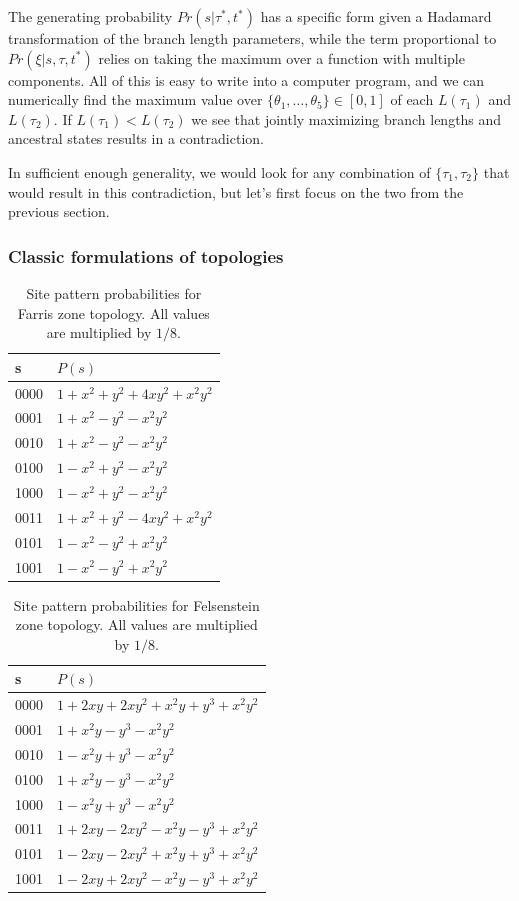 \documentclass[a4paper]{article}
\begin{document}
The generating probability $Pr(s | \tau^*, t^*)$ has a specific form given a Hadamard transformation of the branch length parameters, while the term proportional to $Pr(\xi | s, \tau, t^*)$ relies on taking the maximum over a function with multiple components.
All of this is easy to write into a computer program, and we can numerically find the maximum value over $\{\theta_1, \ldots, \theta_5\}\in[0,1]$ of each $L(\tau_1)$ and $L(\tau_2)$.
If $L(\tau_1) < L(\tau_2)$ we see that jointly maximizing branch lengths and ancestral states results in a contradiction.

In sufficient enough generality, we would look for any combination of $\{\tau_1,\tau_2\}$ that would result in this contradiction, but let's first focus on the two from the previous section.

\subsubsection{Classic formulations of topologies}

\begin{table}
\centering
\begin{tabular}{|l|l|}
    \hline
s   &$P(s)$\\
    \hline
0000&$1+x^2+y^2+4xy^2+x^2y^2$\\
0001&$1+x^2-y^2-x^2y^2$\\
0010&$1+x^2-y^2-x^2y^2$\\
0100&$1-x^2+y^2-x^2y^2$\\
1000&$1-x^2+y^2-x^2y^2$\\
0011&$1+x^2+y^2-4xy^2+x^2y^2$\\
0101&$1-x^2-y^2+x^2y^2$\\
1001&$1-x^2-y^2+x^2y^2$\\
    \hline
\end{tabular}    
\caption{Site pattern probabilities for Farris zone topology.
All values are multiplied by $1/8$.}
\end{table}

\begin{table}
\centering
\begin{tabular}{|l|l|}
    \hline
s   &$P(s)$\\
    \hline
0000&$1+2xy+2xy^2+x^2y+y^3+x^2y^2$\\
0001&$1+x^2y-y^3-x^2y^2$\\
0010&$1-x^2y+y^3-x^2y^2$\\
0100&$1+x^2y-y^3-x^2y^2$\\
1000&$1-x^2y+y^3-x^2y^2$\\
0011&$1+2xy-2xy^2-x^2y-y^3+x^2y^2$\\
0101&$1-2xy-2xy^2+x^2y+y^3+x^2y^2$\\
1001&$1-2xy+2xy^2-x^2y-y^3+x^2y^2$\\
    \hline
\end{tabular}    
\caption{Site pattern probabilities for Felsenstein zone topology.
All values are multiplied by $1/8$.}
\label{tab:sitepatprob-fels}
\end{table}
\end{document}

